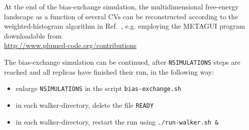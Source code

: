 \documentclass[12pt,fleqn]{report}
\begin{document}
At the end of the bias-exchange simulation, the multidimensional free-energy landscape as a function of several CVs
can be reconstructed according to the weighted-histogram algorithm in Ref.~\cite{marinelli-trpc09},
e.g. employing the METAGUI program~\cite{METAGUI} downloadable from \\ \url{http://www.plumed-code.org/contributions}

The bias-exchange simulation can be continued, after {\tt NSIMULATIONS} steps are reached and all replicas have finished their run, in the following way:
\begin{itemize}
\item enlarge {\tt NSIMULATIONS} in the script {\tt bias-exchange.sh}
\item in each walker-directory, delete the file {\tt READY}
\item in each walker-directory, restart the run using {\tt ./run-walker.sh \&}
\end{itemize}

\clearpage


\printindex
\end{document}
